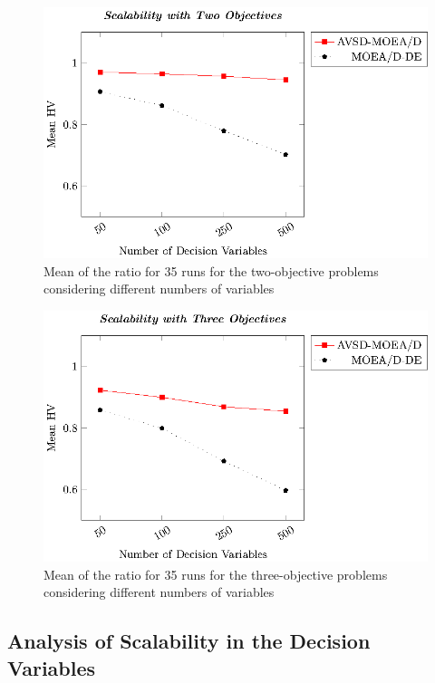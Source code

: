 \begin{figure}[t]
\centering
\includegraphics[scale=0.70]{images/Graphic-Scalability-2obj_tikz-figure0.eps}
\caption{Mean of the \HV{} ratio for 35 runs for the two-objective problems considering different numbers of variables}\label{fig:scalability-2obj}
\end{figure}

\begin{figure}[t]
\centering
\includegraphics[scale=0.70]{images/Graphic-Scalability-3obj_tikz-figure0.eps}
\caption{Mean of the \HV{} ratio for 35 runs for the three-objective problems considering different numbers of variables} \label{fig:scalability-3obj}
\end{figure}

\subsection{Analysis of Scalability in the Decision Variables}

